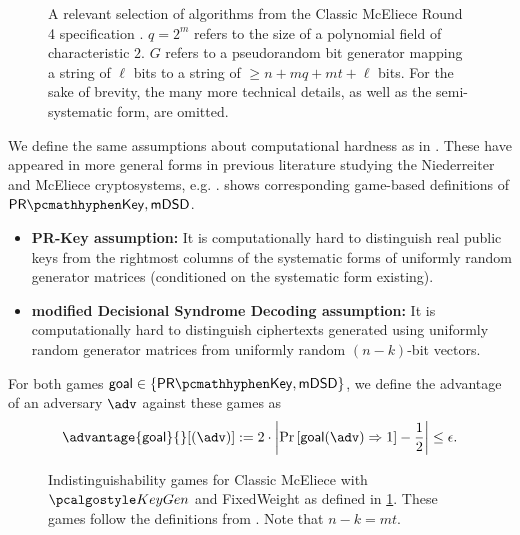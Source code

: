 \begin{figure}
    
    \caption[
        A selection of algorithms from the Classic McEliece Round 4 specification.
    ]{
        A relevant selection of algorithms from the Classic McEliece Round 4 specification \cite{NISTPQC-R4:ClassicMcEliece22}. $q=2^m$ refers to the size of a polynomial field of characteristic $2$. $G$ refers to a pseudorandom bit generator mapping a string of $\ell$ bits to a string of $\geq n + mq + mt + \ell$ bits. For the sake of brevity, the many more technical details, as well as the semi-systematic form, are omitted.}
    \label{fig:classic-mceliece-spec}
\end{figure}

We define the same assumptions about computational hardness as in \cite[Definition~K.1]{EC:Xagawa22}. These have appeared in more general forms in previous literature studying the Niederreiter and McEliece cryptosystems, e.g. \cite{AC:CouFinSen01,EC:SaiXagYam18}.  shows corresponding game-based definitions of $\prkey, \mdsd$.
\begin{itemize}
    \item \textbf{PR-Key assumption:} It is computationally hard to distinguish real public keys from the rightmost columns of the systematic forms of uniformly random generator matrices (conditioned on the systematic form existing).
    \item \textbf{modified Decisional Syndrome Decoding assumption:} It is computationally hard to distinguish ciphertexts generated using uniformly random generator matrices from uniformly random $(n-k)$-bit vectors.
\end{itemize}

For both games $\mathsf{goal} \in \{\prkey, \mdsd\}$, we define the advantage of an adversary $\adv$ against these games as
\[
    \advantage{\mathsf{goal}}{}[(\adv)]
    := 2 \cdot \left| \Pr\left[\mathsf{goal}(\adv) \Rightarrow 1\right] - \frac{1}{2} \right|
    \leq \epsilon.
\]

\begin{figure}
    
    \caption[
        Indistinguishability games for Classic McEliece.
    ]{
        Indistinguishability games for Classic McEliece with $\kgen$ and \textsf{FixedWeight} as defined in \cref{fig:classic-mceliece-spec}. These games follow the definitions from \cite[Definition~K.1]{EC:Xagawa22}. Note that $n-k = mt$.}
    \label{fig:classic-mceliece-assumptions}
\end{figure}

